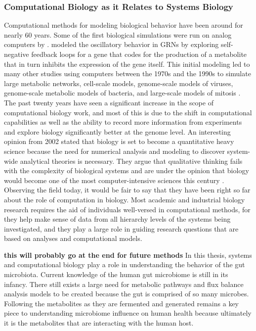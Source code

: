 \subsubsection{Computational Biology as it Relates to Systems Biology} \label{intro-compbio}
Computational methods for modeling biological behavior have been around for nearly 60 years. Some of the first biological simulations were run on analog computers by \citet{Goodwin1963}.  \citeauthor{Goodwin1963} modeled the oscillatory behavior in \acrshort{GRNs} by exploring self-negative feedback loops for a gene that codes for the production of a metabolite that in turn inhibits the expression of the gene itself. This initial modeling led to many other studies using computers between the 1970s and the 1990s to simulate large metabolic networks, cell-scale models, genome-scale models of viruses, genome-scale metabolic models of bacteria, and large-scale models of mitosis \citep{Palsson2006}. The past twenty years have seen a significant increase in the scope of computational biology work, and most of this is due to the shift in computational capabilities as well as the ability to record more information from experiments and explore biology significantly better at the genome level. An interesting opinion from 2002 stated that biology is set to become a quantitative heavy science because the need for numerical analysis and modeling to discover system-wide analytical theories is necessary. They argue that qualitative thinking fails with the complexity of biological systems and are under the opinion that biology would become one of the most computer-intensive sciences this century \citep{Noble2002}. Observing the field today, it would be fair to say that they have been right so far about the role of computation in biology. Most academic and industrial biology research requires the aid of individuals well-versed in computational methods, for they help make sense of data from all hierarchy levels of the systems being investigated, and they play a large role in guiding research questions that are based on analyses and computational models.   

\textbf{this will probably go at the end for future methods}
In this thesis, systems and computational biology play a role in understanding the behavior of the gut microbiota. Current knowledge of the human gut microbiome is still in its infancy. There still exists a large need for metabolic pathways and flux balance analysis models to be created because the gut is comprised of so many microbes. Following the metabolites as they are fermented and generated remains a key piece to understanding microbiome influence on human health because ultimately it is the metabolites that are interacting with the human host. 

